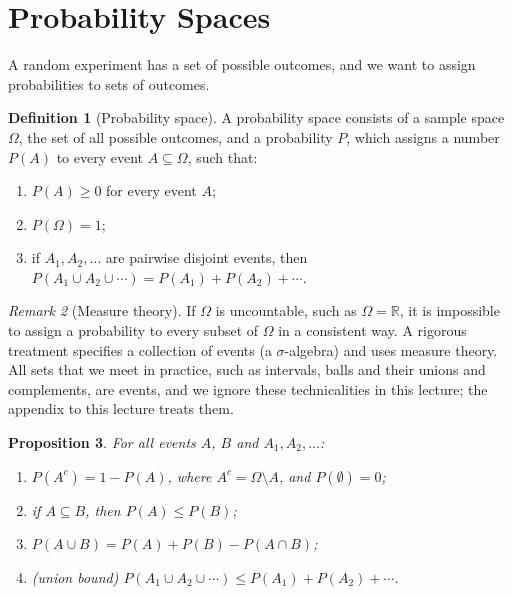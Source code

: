 \documentclass[11pt]{article}
\theoremstyle{definition}
\newtheorem{definition}{Definition}[section]
\theoremstyle{plain}
\newtheorem{proposition}[definition]{Proposition}
\theoremstyle{remark}
\newtheorem{remark}[definition]{Remark}
\begin{document}
\section{Probability Spaces}\label{sec:probability}

A random experiment has a set of possible outcomes, and we want to assign probabilities to sets of outcomes.

\begin{definition}[Probability space]\label{def:probability}
    A probability space consists of a sample space $\Omega$, the set of all possible outcomes, and a probability $P$, which assigns a number $P(A)$ to every event $A \subseteq \Omega$, such that:
    \begin{enumerate}
        \item $P(A) \geq 0$ for every event $A$;
        \item $P(\Omega) = 1$;
        \item if $A_1, A_2, \ldots$ are pairwise disjoint events, then $P(A_1 \cup A_2 \cup \cdots) = P(A_1) + P(A_2) + \cdots$.
    \end{enumerate}
\end{definition}

\begin{remark}[Measure theory]\label{rem:measure-theory}
    If $\Omega$ is uncountable, such as $\Omega = \mathbb{R}$, it is impossible to assign a probability to every subset of $\Omega$ in a consistent way. A rigorous treatment specifies a collection of events (a $\sigma$-algebra) and uses measure theory. All sets that we meet in practice, such as intervals, balls and their unions and complements, are events, and we ignore these technicalities in this lecture; the appendix to this lecture treats them.
\end{remark}

\begin{proposition}\label{prop:probability-rules}
    For all events $A$, $B$ and $A_1, A_2, \ldots$:
    \begin{enumerate}
        \item $P(A^c) = 1 - P(A)$, where $A^c = \Omega \setminus A$, and $P(\emptyset) = 0$;
        \item if $A \subseteq B$, then $P(A) \leq P(B)$;
        \item $P(A \cup B) = P(A) + P(B) - P(A \cap B)$;
        \item (union bound) $P(A_1 \cup A_2 \cup \cdots) \leq P(A_1) + P(A_2) + \cdots$.
    \end{enumerate}
\end{proposition}
\end{document}
